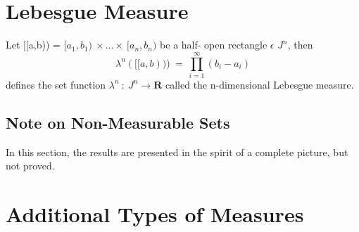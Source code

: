 \section{Lebesgue Measure}
\begin{definition}
    Let [[a,b)) = $[a_1,b_1) \: \times...\times \: [a_n,b_n)$ be a half- open
    rectangle $\epsilon$ $J^n$, then
    \[
        \lambda^n([[a,b))) \: = \: \prod_{i=1}^{\infty}(b_i - a_i)
    \]
        defines the set function $\lambda^n \: : \: J^n \rightarrow \bm{R}$
        called the n-dimensional Lebesgue measure.
\end{definition}

\subsection{Note on Non-Measurable Sets}
In this section, the results are presented in the spirit of a complete picture,
but not proved.


\section{Additional Types of Measures}

